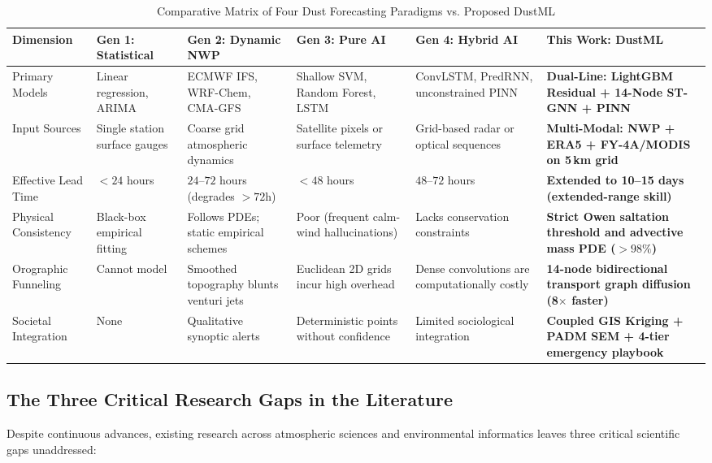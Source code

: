 \begin{table}[H]
\centering
\small
\caption{Comparative Matrix of Four Dust Forecasting Paradigms vs. Proposed DustML}
\label{tab:paradigms_synthesis}
\begin{tabularx}{\textwidth}{l p{2.2cm} p{2.2cm} p{2.3cm} p{2.2cm} X}
\toprule
\textbf{Dimension} & \textbf{Gen 1: Statistical} & \textbf{Gen 2: Dynamic NWP} & \textbf{Gen 3: Pure AI} & \textbf{Gen 4: Hybrid AI} & \textbf{This Work: DustML} \\
\midrule
Primary Models & Linear regression, ARIMA & ECMWF IFS, WRF-Chem, CMA-GFS & Shallow SVM, Random Forest, LSTM & ConvLSTM, PredRNN, unconstrained PINN & \textbf{Dual-Line: LightGBM Residual + 14-Node ST-GNN + PINN} \\
Input Sources & Single station surface gauges & Coarse grid atmospheric dynamics & Satellite pixels or surface telemetry & Grid-based radar or optical sequences & \textbf{Multi-Modal: NWP + ERA5 + FY-4A/MODIS on 5\,km grid} \\
Effective Lead Time & $< 24$ hours & $24\text{--}72$ hours (degrades $>72$h) & $< 48$ hours & $48\text{--}72$ hours & \textbf{Extended to 10--15 days (extended-range skill)} \\
Physical Consistency & Black-box empirical fitting & Follows PDEs; static empirical schemes & Poor (frequent calm-wind hallucinations) & Lacks conservation constraints & \textbf{Strict Owen saltation threshold and advective mass PDE ($>98\%$)} \\
Orographic Funneling & Cannot model & Smoothed topography blunts venturi jets & Euclidean 2D grids incur high overhead & Dense convolutions are computationally costly & \textbf{14-node bidirectional transport graph diffusion (8$\times$ faster)} \\
Societal Integration & None & Qualitative synoptic alerts & Deterministic points without confidence & Limited sociological integration & \textbf{Coupled GIS Kriging + PADM SEM + 4-tier emergency playbook} \\
\bottomrule
\end{tabularx}
\end{table}

\subsection{The Three Critical Research Gaps in the Literature}
\label{subsec:three_gaps}

Despite continuous advances, existing research across atmospheric sciences and environmental informatics leaves three critical scientific gaps unaddressed:

